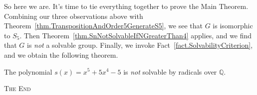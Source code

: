 So here we are. It's time to tie everything together to prove the Main Theorem. Combining  our three observations above with Theorem~\ref{thm.TranspositionAndOrder5GenerateS5}, we see that $G$ is isomorphic to $S_5$. Then Theorem~\ref{thm.SnNotSolvableIfNGreaterThan4} applies, and we find that $G$ is \emph{not} a solvable group. Finally, we invoke Fact~\ref{fact.SolvabilityCriterion}, and we obtain the following theorem.

\begin{theorem}
The polynomial $s(x) = x^5 +5x^4-5$ is \emph{not} solvable by radicals over $\mathbb{Q}$.
\end{theorem}

\begin{center}
\textsc{The End}
\end{center}









